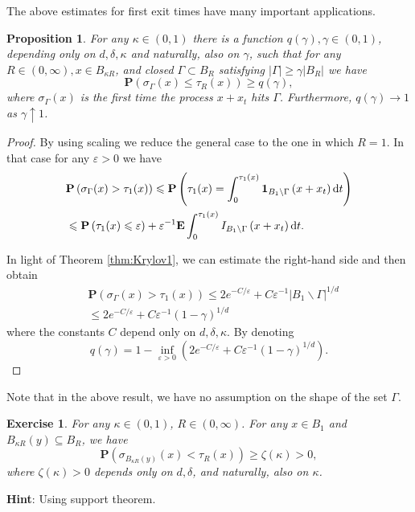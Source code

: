 \documentclass[twoside, 12pt]{book}
\numberwithin{equation}{chapter}
\newtheorem{proposition}[theorem]{Proposition}
\newtheorem{exercise}{Exercise}[section]
\def\bE{{\mathbf E}}
\def\bP{{\mathbf P}}
\def\l{\left}
\def\r{\right}
\def\geq{\geqslant}
\def\leq{\leqslant}
\def\1{{\mathbf{1}}}
\def\d{\text{\rm{d}}}
\begin{document}
	The above estimates for first exit times have many important applications. 
	
	\begin{proposition}\label{prop:hit}
		For any $\kappa \in(0,1)$ there is a function $q(\gamma), \gamma \in(0,1)$, depending only on $d, \delta,\kappa$ and naturally, also on $\gamma$, such that for any $R \in(0, \infty), x \in B_{\kappa R}$, and closed $\Gamma \subset B_R$ satisfying $|\Gamma| \geq \gamma\left|B_R\right|$ we have
		\[
		\bP\left(\sigma_{\Gamma}(x) \leq \tau_R(x)\right) \geq q(\gamma),
		\]
		where $\sigma_{\Gamma}(x)$ is the first time the process $x+x_t$ hits $\Gamma$. Furthermore, $q(\gamma) \rightarrow 1$ as $\gamma \uparrow 1$. 
	\end{proposition}
	\begin{proof}
		By using scaling we reduce the general case to the one in which $R=1$. In that case for any $\varepsilon>0$ we have
		$$
		\begin{aligned}
			& \bP\left(\sigma_{\Gamma}(x)>\tau_1(x)\right) \leq \bP\left(\tau_1(x)=\int_0^{\tau_1(x)} \1_{B_1 \backslash \Gamma}\left(x+x_t\right) \d t\right) \\
			& \leq \bP\left(\tau_1(x) \leq \varepsilon\right)+\varepsilon^{-1} \bE \int_0^{\tau_1(x)} I_{B_1 \backslash \Gamma}\left(x+x_t\right) \d t .
		\end{aligned}
		$$
		
		In light of Theorem \ref{thm:Krylov1}, we can estimate the right-hand side and then obtain
		$$
		\begin{aligned}
			& \bP\left(\sigma_{\Gamma}(x)>\tau_1(x)\right) \leq 2 e^{-C/ \varepsilon}+C \varepsilon^{-1}\left|B_1 \backslash \Gamma\right|^{1 / d} \\
			& \leq 2 e^{-C / \varepsilon}+C \varepsilon^{-1}(1-\gamma)^{1 / d}
		\end{aligned}
		$$
		where the constants $C$ depend only on $d, \delta, \kappa$. By denoting
		$$
		q(\gamma)=1-\inf _{\varepsilon>0}\left(2 e^{-C / \varepsilon}+ C \varepsilon^{-1}(1-\gamma)^{1 / d}\right). 
		$$
	\end{proof}
	Note that in the above result, we have no assumption on the shape of the set $\Gamma$. 
	
	\begin{exercise}
		For any $\kappa \in(0,1)$, $R \in(0, \infty)$. For any $x\in B_1$ and $B_{\kappa R}(y)\subseteq B_R$, we have 
		\[
		\bP\l(\sigma_{B_{\kappa R}(y)} (x) <\tau_{R}(x) \r)\geq \zeta(\kappa)>0,  
		\]
		where $\zeta(\kappa)>0$ depends only on $d, \delta$, and naturally, also on $\kappa$.
	\end{exercise}
	{\bf Hint}: Using support theorem. 
	
\end{document}
